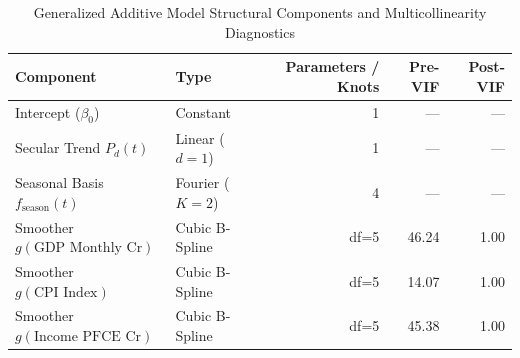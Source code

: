 \begin{table}[htbp]
\centering
\caption{Generalized Additive Model Structural Components and Multicollinearity Diagnostics}
\label{tab:gam_components}
\begin{tabular}{llrrr}
\toprule
Component & Type & Parameters / Knots & Pre-VIF & Post-VIF \\
\midrule
Intercept ($\beta_0$) & Constant & 1 & --- & --- \\
Secular Trend $P_d(t)$ & Linear ($d=1$) & 1 & --- & --- \\
Seasonal Basis $f_{\text{season}}(t)$ & Fourier ($K=2$) & 4 & --- & --- \\
Smoother $g(\text{GDP Monthly Cr})$ & Cubic B-Spline & df=5 & 46.24 & 1.00 \\
Smoother $g(\text{CPI Index})$ & Cubic B-Spline & df=5 & 14.07 & 1.00 \\
Smoother $g(\text{Income PFCE Cr})$ & Cubic B-Spline & df=5 & 45.38 & 1.00 \\
\bottomrule
\end{tabular}
\end{table}